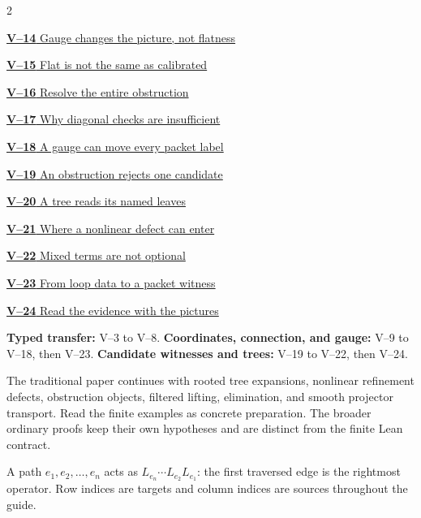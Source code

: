 \documentclass[11pt,a4paper]{article}
\newcommand{\head}[1]{\par\vspace{2pt}{\sffamily\bfseries\normalsize #1}\par\vspace{1pt}}
\begin{document}
\begin{multicols}{2}
{\small\noindent\hyperlink{vpage14}{\textbf{V--14} Gauge changes the picture, not flatness}\par\smallskip}
{\small\noindent\hyperlink{vpage15}{\textbf{V--15} Flat is not the same as calibrated}\par\smallskip}
{\small\noindent\hyperlink{vpage16}{\textbf{V--16} Resolve the entire obstruction}\par\smallskip}
{\small\noindent\hyperlink{vpage17}{\textbf{V--17} Why diagonal checks are insufficient}\par\smallskip}
{\small\noindent\hyperlink{vpage18}{\textbf{V--18} A gauge can move every packet label}\par\smallskip}
{\small\noindent\hyperlink{vpage19}{\textbf{V--19} An obstruction rejects one candidate}\par\smallskip}
{\small\noindent\hyperlink{vpage20}{\textbf{V--20} A tree reads its named leaves}\par\smallskip}
{\small\noindent\hyperlink{vpage21}{\textbf{V--21} Where a nonlinear defect can enter}\par\smallskip}
{\small\noindent\hyperlink{vpage22}{\textbf{V--22} Mixed terms are not optional}\par\smallskip}
{\small\noindent\hyperlink{vpage23}{\textbf{V--23} From loop data to a packet witness}\par\smallskip}
{\small\noindent\hyperlink{vpage24}{\textbf{V--24} Read the evidence with the pictures}\par\smallskip}

\end{multicols}
\medskip
\head{Three reading routes}
\textbf{Typed transfer:} V--3 to V--8.
\textbf{Coordinates, connection, and gauge:} V--9 to V--18, then V--23.
\textbf{Candidate witnesses and trees:} V--19 to V--22, then V--24.
\head{From the finite models to the broader paper}
The traditional paper continues with rooted tree expansions, nonlinear
refinement defects, obstruction objects, filtered lifting, elimination, and
smooth projector transport. Read the finite examples as concrete preparation.
The broader ordinary proofs keep their own hypotheses and are distinct from
the finite Lean contract.

\head{Read products in traversal order}
A path $e_1,e_2,\ldots,e_n$ acts as $L_{e_n}\cdots L_{e_2}L_{e_1}$:
the first traversed edge is the rightmost operator. Row indices are targets
and column indices are sources throughout the guide.
\clearpage
{}

\end{document}
